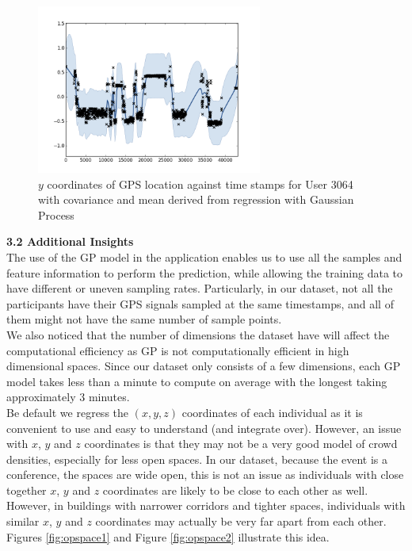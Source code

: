 \documentclass[letterpaper]{article}
\begin{document}
\begin{figure}[h!]
  \centering
    \includegraphics[width=280px,natwidth=634,natheight=442]{selected_GP/3064.csv_Y.png}
  \caption{$y$ coordinates of GPS location against time stamps for User 3064 with covariance and mean derived from regression with Gaussian Process}
  \label{fig:GP2}
\end{figure}

{\bf3.2  Additional Insights} \\

The use of the GP model in the application enables us to use all the samples and feature information to perform the prediction, while allowing the training data to have different or uneven sampling rates. Particularly, in our dataset, not all the participants have their GPS signals sampled at the same timestamps, and all of them might not have the same number of sample points. \\

We also noticed that the number of dimensions the dataset have will affect the computational efficiency as GP is not computationally efficient in high dimensional spaces. Since our dataset only consists of a few dimensions, each GP model takes less than a minute to compute on average with the longest taking approximately 3 minutes.\\

Be default we regress the $(x,y,z)$ coordinates of each individual as it is convenient to use and easy to understand (and integrate over). However, an issue with $x$, $y$ and $z$ coordinates is that they may not be a very good model of crowd densities, especially for less open spaces. In our dataset, because the event is a conference, the spaces are wide open, this is not an issue as individuals with close together $x$, $y$ and $z$ coordinates are likely to be close to each other as well. However, in buildings with narrower corridors and tighter spaces, individuals with similar $x$, $y$ and $z$ coordinates may actually be very far apart from each other. Figures \ref{fig:opspace1} and Figure \ref{fig:opspace2} illustrate this idea.
\end{document}
